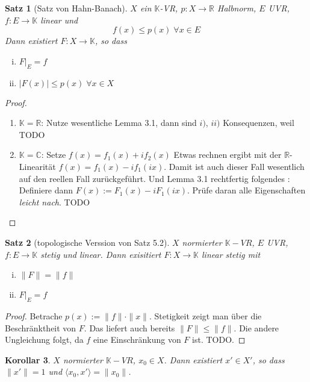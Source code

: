 \documentclass[ngerman]{report}
\theoremstyle{plain}%
\newtheorem{thm}{Satz}[chapter]
\newtheorem{cor}[thm]{Korollar}
\theoremstyle{definition}%
\theoremstyle{myStyle}
\newcommand{\C}{\mathbb{C}}
\newcommand{\R}{\mathbb{R}}
\newcommand{\K}{\mathbb{K}}
\newcommand{\norm}[1]{\|#1\|}
\begin{document}
	\begin{thm}[Satz von Hahn-Banach]
		$X$ ein $\K$-VR, $p: X \to \R$ Halbnorm, $E$ UVR, $f: E \to \K$ linear und
			$$ f(x) \leq p(x) \; \forall x \in E$$
	Dann existiert $F: X \to \K$, so dass 
		\begin{enumerate}[(i)]
			\item $F|_E = f$
			\item $|F(x)| \leq p(x) \; \forall x \in X$
		\end{enumerate}
	\end{thm}

	\begin{proof}
		\begin{enumerate}[{Fall} 1]
			\item $\K = \R$: Nutze wesentliche Lemma 3.1, dann sind $i)$, $ii)$ Konsequenzen, weil TODO
			\item $\K = \C$: Setze $f(x) = f_1(x) + i f_2(x)$ Etwas rechnen ergibt mit der $\R$-Linearität 
				$f(x) = f_1(x) - i f_1(ix)$. Damit ist auch dieser Fall wesentlich auf den reellen Fall zurückgeführt. Und Lemma 3.1 rechtfertig folgendes :
				Definiere dann $F(x) := F_1(x) - i F_1(ix)$. Prüfe daran alle Eigenschaften \textit{leicht nach}.
				TODO
		\end{enumerate}
	\end{proof}

	\begin{thm}[topologische Verssion von Satz 5.2]
		$X$ normierter $\K-VR$, $E$ UVR, $f: E\to \K$ stetig und linear. Dann exisitiert $F : X\to \K$ linear stetig mit 
				\begin{enumerate}[(i)]
					\item $\norm{F} = \norm{f}$
					\item $F|_E = f$
				\end{enumerate}
	\end{thm}
	
	\begin{proof}
		Betrache $p(x) := \norm{f}\cdot \norm{x}$. Stetigkeit zeigt man über die Beschränktheit von $F$. Das liefert auch bereits $\norm{F} \leq \norm{f}$. Die andere Ungleichung folgt, da $f$ eine Einschränkung von $F$ ist. TODO.
	\end{proof}

	\begin{cor}
		$X$ normierter $\K-VR$, $x_0 \in X$. Dann existiert $x' \in X'$, so dass $\norm{x'} =1$ und $\langle x_0, x' \rangle = \norm{x_0}$.
	\end{cor}
\end{document}
